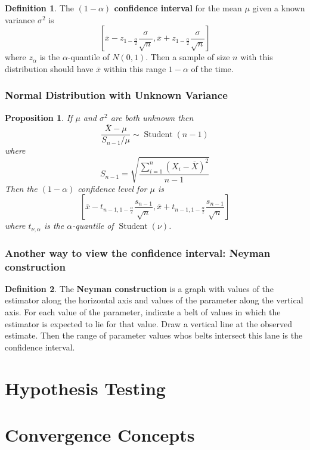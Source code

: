 \documentclass[12pt]{article}
\newtheorem*{prop*}{Proposition}
\theoremstyle{definition}
\newtheorem*{defn*}{Definition}
\DeclareMathOperator{\Student}{Student}
\begin{document}
\begin{defn*}
  The \textbf{$(1 - \alpha)$ confidence interval} for the mean $\mu$ given a known variance $\sigma^2$ is
  $$\left[\overline{x} - z_{1 - \frac{\alpha}{2}}\frac{\sigma}{\sqrt{n}}, \overline{x} + z_{1 - \frac{\alpha}{2}}\frac{\sigma}{\sqrt{n}}\right]$$
  where $z_\alpha$ is the $\alpha$-quantile of $N(0, 1)$.
  Then a sample of size $n$ with this distribution should have $\overline{x}$ within this range $1 - \alpha$ of the time.
\end{defn*}

\subsubsection{Normal Distribution with Unknown Variance}

\begin{prop*}
  If $\mu$ and $\sigma^2$ are both unknown then 
  $$\frac{\overline{X} - \mu}{S_{n - 1} / \mu} \sim \Student(n - 1)$$
  where
  $$S_{n - 1} = \sqrt{\frac{\sum_{i = 1}^n(X_i - \overline{X})^2}{n - 1}}$$
  Then the $(1 - \alpha)$ confidence level for $\mu$ is
  $$\left[\overline{x} - t_{n - 1, 1 - \frac{\alpha}{2}}\frac{s_{n - 1}}{\sqrt{n}}, \overline{x} + t_{n - 1, 1 - \frac{\alpha}{2}}\frac{s_{n - 1}}{\sqrt{n}}\right]$$
  where $t_{\nu, \alpha}$ is the $\alpha$-quantile of $\Student(\nu)$.
\end{prop*}

\subsubsection{Another way to view the confidence interval: Neyman construction}

\begin{defn*}
  The \textbf{Neyman construction} is a graph with values of the estimator along the horizontal axis and values of the parameter along the vertical axis.
  For each value of the parameter, indicate a belt of values in which the estimator is expected to lie for that value.
  Draw a vertical line at the observed estimate.
  Then the range of parameter values whos belts intersect this lane is the confidence interval.
\end{defn*}

\section{Hypothesis Testing}

\section{Convergence Concepts}
\end{document}
